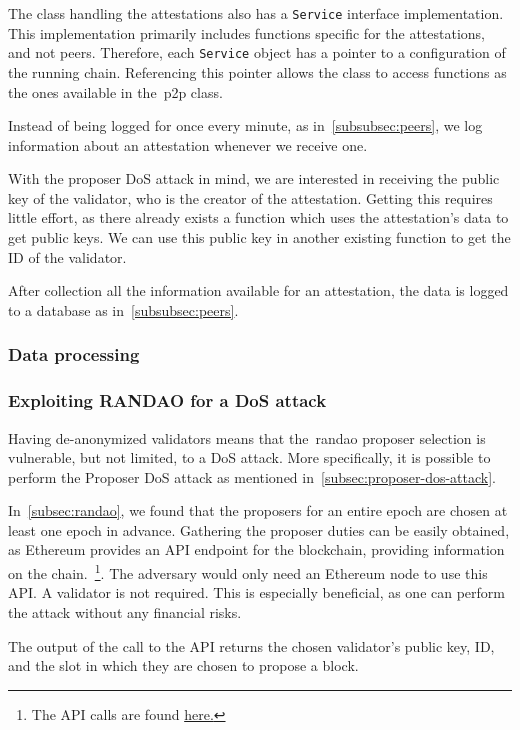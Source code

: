 The class handling the attestations also has a \texttt{Service} interface implementation.
This implementation primarily includes functions specific for the attestations, and not peers.
Therefore, each \texttt{Service} object has a pointer to a configuration of the running chain.
Referencing this pointer allows the class to access functions as the ones available in the~\gls{p2p} class.

Instead of being logged for once every minute, as in~\autoref{subsubsec:peers},
we log information about an attestation whenever we receive one.

With the proposer DoS attack in mind, we are interested in receiving the public key of the validator,
who is the creator of the attestation.
Getting this requires little effort,
as there already exists a function which uses the attestation's data to get public keys.
We can use this public key in another existing function to get the ID of the validator.

After collection all the information available for an attestation,
the data is logged to a database as in~\autoref{subsubsec:peers}.

\subsubsection{Data processing}

\subsubsection{Exploiting RANDAO for a DoS attack}
Having de-anonymized validators means that the~\gls{randao} proposer selection is vulnerable, but not limited, to a DoS attack.
More specifically, it is possible to perform the Proposer DoS attack as mentioned in~\autoref{subsec:proposer-dos-attack}.

In~\autoref{subsec:randao}, we found that the proposers for an entire epoch are chosen at least one epoch in advance.
Gathering the proposer duties can be easily obtained, as Ethereum provides an API endpoint for the blockchain, providing information on the chain.~\footnote{The API calls are found \href{https://ethereum.github.io/beacon-APIs/#/Validator/getProposerDuties}{here.}}.
The adversary would only need an Ethereum node to use this API.
A validator is not required.
This is especially beneficial, as one can perform the attack without any financial risks.

The output of the call to the API returns the chosen validator's public key, ID, and the slot in which they are chosen to propose a block.

